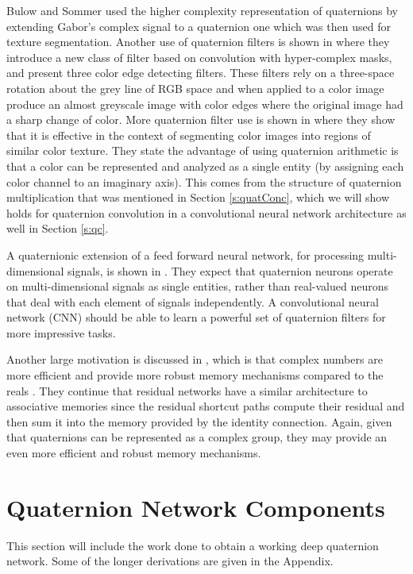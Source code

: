 Bulow and Sommer \cite{bulow2001hypercomplex} used the higher complexity representation of quaternions by extending Gabor's complex signal to a quaternion one which was then used for texture segmentation.
Another use of quaternion filters is shown in \cite{sangwine2000colour} where they introduce a new class of filter based on convolution with hyper-complex masks, and present three color edge detecting filters. 
These filters rely on a three-space rotation about the grey line of RGB space and when applied to a color image produce an almost greyscale image with color edges where the original image had a sharp change of color.
More quaternion filter use is shown in \cite{shi2007quaternion} where they show that it is effective in the context of segmenting color images into regions of similar color texture. 
They state the advantage of using quaternion arithmetic is that a color can be represented and analyzed as a single entity (by assigning each color channel to an imaginary axis).
This comes from the structure of quaternion multiplication that was mentioned in Section \ref{s:quatConc}, which we will show holds for quaternion convolution in a convolutional neural network architecture as well in Section \ref{s:qc}.

A quaternionic extension of a feed forward neural network, for processing multi-dimensional signals, is shown in \cite{minemoto2017feed}.
They expect that quaternion neurons operate on multi-dimensional signals as single entities, rather than real-valued neurons that deal with each element of signals independently.
A convolutional neural network (CNN) should be able to learn a powerful set of quaternion filters for more impressive tasks.

Another large motivation is discussed in \cite{trabelsi2017deep}, which is that complex numbers are more efficient and provide more robust memory mechanisms compared to the reals \cite{bulow1999hypercomplex, sangwine2000colour, bulow2001hypercomplex}.
They continue that residual networks have a similar architecture to associative memories since the residual shortcut paths compute their residual and then sum it into the memory provided by the identity connection.
Again, given that quaternions can be represented as a complex group, they may provide an even more efficient and robust memory mechanisms.


\section{Quaternion Network Components}
This section will include the work done to obtain a working deep quaternion network. 
Some of the longer derivations are given in the Appendix.

